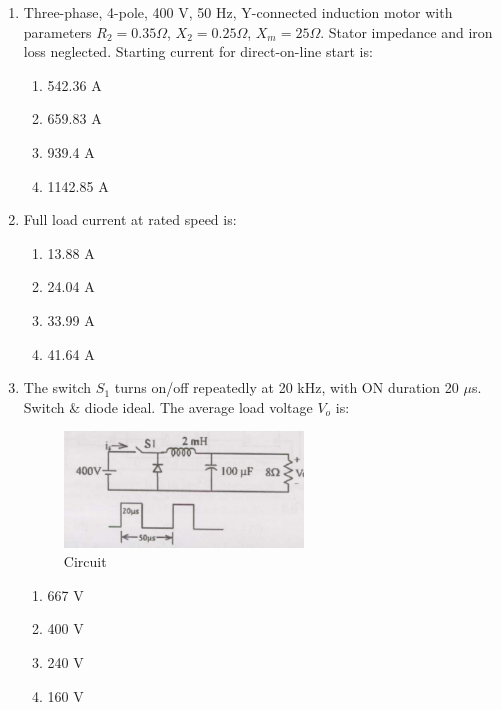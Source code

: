 \documentclass[journal,cmex10]{IEEEtran}
\theoremstyle{remark}
\numberwithin{equation}{enumi}
\numberwithin{figure}{enumi}
\begin{document}
\begin{enumerate}[label=\arabic*)]
    \item Three-phase, 4-pole, 400 V, 50 Hz, Y-connected induction motor with parameters $R_2=0.35 \Omega$, $X_2=0.25 \Omega$, $X_m=25 \Omega$. Stator impedance and iron loss neglected. Starting current for direct-on-line start is:
    \bigskip
    \hfill {}
    \begin{enumerate}[label=\alph*)]
        \item 542.36 A
        \item 659.83 A
        \item 939.4 A
        \item 1142.85 A
    \end{enumerate}
    \bigskip

    \item Full load current at rated speed is:
    \bigskip
    \hfill {}
    \begin{enumerate}[label=\alph*)]
        \item 13.88 A
        \item 24.04 A
        \item 33.99 A
        \item 41.64 A
    \end{enumerate}
    \bigskip

    \item The switch $S_1$ turns on/off repeatedly at 20 kHz, with ON duration 20 $\mu$s. Switch \& diode ideal. The average load voltage $V_o$ is:
    \begin{figure}[htbp]
  \centering
  \includegraphics[width=0.6\textwidth]{figs/C/fig13.png}
  \caption{Circuit}
  \label{C/fig13.png}
\end{figure}
    \bigskip
    \hfill {}
    \begin{enumerate}[label=\alph*)]
        \item 667 V
        \item 400 V
        \item 240 V
        \item 160 V
    \end{enumerate}
    \newpage


\end{enumerate}
\end{document}
